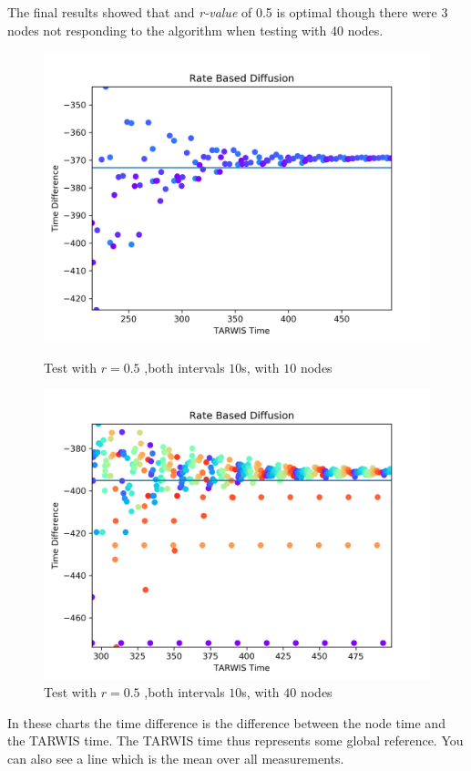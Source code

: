 \documentclass{llncs}
\begin{document}
The final results showed that and \textit{r-value} of 0.5 is optimal though there were 3 nodes not responding to the algorithm when testing with 40 nodes.
\begin{figure}[H]
  \centering
  \includegraphics[width=\linewidth]{05_10.png}
  \caption{Test with $r=0.5$ ,both intervals $10$s, with $10$ nodes}
  \label{fig:Test with 10 Nodes}
  
  \centering
  \includegraphics[width=\linewidth]{05_10_40.png}
  \caption{Test with $r=0.5$ ,both intervals $10$s, with $40$ nodes}
  \label{fig:Test with 40 Nodes}
\end{figure}

In these charts the time difference is the difference between the node time and the TARWIS time. The TARWIS time thus represents some global reference. You can also see a line which is the mean over all measurements.
\end{document}
